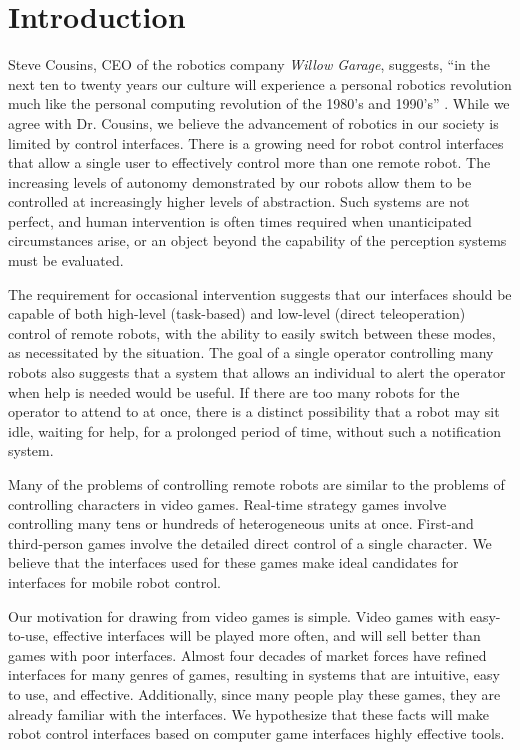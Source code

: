 \chapter{Introduction}
Steve Cousins, CEO of the robotics company \emph{Willow Garage}, suggests, ``in the next ten to twenty years our culture will experience a personal robotics revolution much like the personal computing revolution of the 1980's and 1990's'' \cite{Cousins}. While we agree with Dr. Cousins, we believe the advancement of robotics in our society is limited by control interfaces. There is a growing need for robot control interfaces that allow a single user to effectively control more than one remote robot. The increasing levels of autonomy demonstrated by our robots allow them to be controlled at increasingly higher levels of abstraction. Such systems are not perfect, and human intervention is often times required when unanticipated circumstances arise, or an object beyond the capability of the perception systems must be evaluated.

The requirement for occasional intervention suggests that our interfaces should be capable of both high-level (task-based) and low-level (direct teleoperation) control of remote robots, with the ability to easily switch between these modes, as necessitated by the situation. The goal of a single operator controlling many robots also suggests that a system that allows an individual to alert the operator when help is needed would be useful. If there are too many robots for the operator to attend to at once, there is a distinct possibility that a robot may sit idle, waiting for help, for a prolonged period of time, without such a notification system. 

Many of the problems of controlling remote robots are similar to the problems of controlling characters in video games. Real-time strategy games involve controlling many tens or hundreds of heterogeneous units at once. First-and third-person games involve the detailed direct control of a single character. We believe that the interfaces used for these games make ideal candidates for interfaces for mobile robot control.

Our motivation for drawing from video games is simple. Video games with easy-to-use, effective interfaces will be played more often, and will sell better than games with poor interfaces. Almost four decades of market forces have refined interfaces for many genres of games, resulting in systems that are intuitive, easy to use, and effective. Additionally, since many people play these games, they are already familiar with the interfaces. We hypothesize that these facts will make robot control interfaces based on computer game interfaces highly effective tools.



